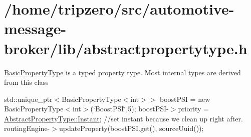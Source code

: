 \hypertarget{_2home_2tripzero_2src_2automotive-message-broker_2lib_2abstractpropertytype_8h-example}{\section{/home/tripzero/src/automotive-\/message-\/broker/lib/abstractpropertytype.\-h}
}
\hyperlink{classBasicPropertyType}{Basic\-Property\-Type} is a typed property type. Most internal types are derived from this class

std\-::unique\-\_\-ptr$<$Basic\-Property\-Type$<$int$>$$>$ boost\-P\-S\-I = new Basic\-Property\-Type$<$int$>$(\char`\"{}\-Boost\-P\-S\-I\char`\"{},5); boost\-P\-S\-I-\/$>$priority = \hyperlink{classAbstractPropertyType_a1e513f66eb2dd2bd2cddbec16422af63a5ef5703d3d1af9d204d6d2f3cf41569a}{Abstract\-Property\-Type\-::\-Instant}; //set instant because we clean up right after. routing\-Engine-\/$>$update\-Property(boost\-P\-S\-I.\-get(), source\-Uuid());


\begin{DoxyCodeInclude}
\end{DoxyCodeInclude}
 